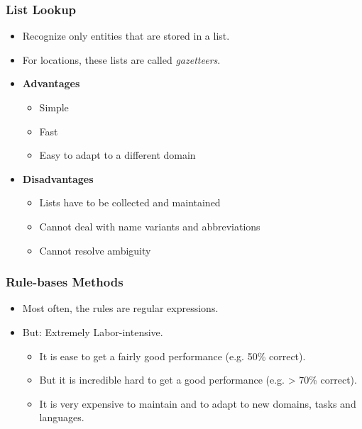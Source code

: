             \subsubsection{List Lookup} %
                \begin{itemize}
                	\item Recognize only entities that are stored in a list.
                	\item For locations, these lists are called \textit{gazetteers}.
                	\item \textbf{Advantages}
                		\begin{itemize}
                			\item Simple
                			\item Fast
                			\item Easy to adapt to a different domain
                		\end{itemize}
                	\item \textbf{Disadvantages}
                		\begin{itemize}
                			\item Lists have to be collected and maintained
                			\item Cannot deal with name variants and abbreviations
                			\item Cannot resolve ambiguity
                		\end{itemize}
                \end{itemize}

            \subsubsection{Rule-bases Methods} %
                \begin{itemize}
                	\item Most often, the rules are regular expressions.
                	\item But: Extremely Labor-intensive.
                		\begin{itemize}
                			\item It is ease to get a fairly good performance (e.g. 50\% correct).
                			\item But it is incredible hard to get a good performance (e.g. > 70\% correct).
                			\item It is very expensive to maintain and to adapt to new domains, tasks and languages.
                		\end{itemize}
                \end{itemize}


